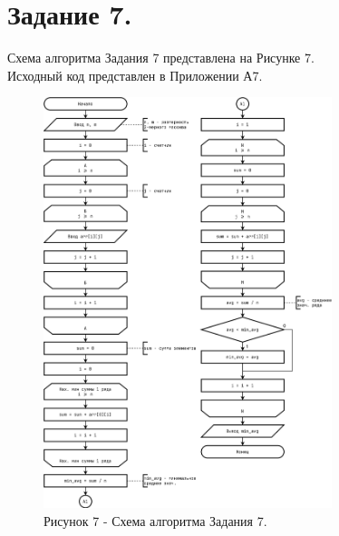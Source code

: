 \documentclass[oneside,a4paper,14pt]{extarticle}
\begin{document}
\section*{Задание 7.}
\noindent Схема алгоритма Задания 7 представлена на Рисунке 7.\\
\noindent Исходный код представлен в Приложении А7. \\
\newpage
\begin{figure}[!ht]
	\centering
	\includegraphics[width=0.75\textwidth]{pics/flowchart-19.png}
	\caption*{Рисунок 7 - Схема алгоритма Задания 7.}
\end{figure}
\end{document}
